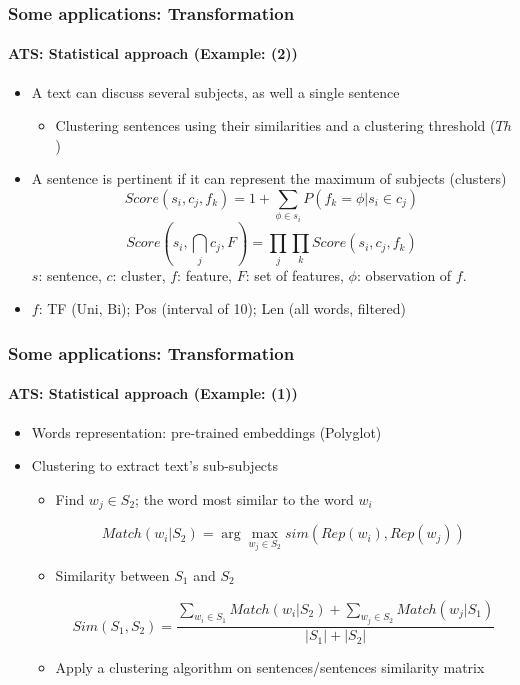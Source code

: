 \documentclass[xcolor=table]{beamer}
\begin{document}
\begin{frame}
	\frametitle{Some applications: Transformation}
	\framesubtitle{ATS: Statistical approach (Example: \cite{13-aries-al} (2))}
	
	\begin{itemize}
		\item A text can discuss several subjects, as well a single sentence
		\begin{itemize}
			\item Clustering sentences using their similarities and a clustering threshold ($Th$)
		\end{itemize}
		\item A sentence is pertinent if it can represent the maximum of subjects (clusters)
		\[ Score(s_i , c_j , f_k ) = 1 + \sum_{\phi \in s_i} {P(f_k=\phi | s_i \in c_j)} \]
		\[ Score(s_i , \bigcap_{j} c_j , F) =  %
		\prod_{j} \prod_{k} Score(s_i , c_j , f_k ) \]
		$ s $: sentence, $ c $: cluster, $ f $: feature, $ F $: set of features, $ \phi $: observation of $ f $.
		\item $f$: TF (Uni, Bi); Pos (interval of 10); Len (all words, filtered)
	\end{itemize}
	
\end{frame}

\begin{frame}
	\frametitle{Some applications: Transformation}
	\framesubtitle{ATS: Statistical approach (Example: \cite{15-oufaida-al} (1))}
	\begin{itemize}
		\item Words representation: pre-trained embeddings (Polyglot)
		\item Clustering to extract text's sub-subjects
		\begin{itemize}
			\item Find $w_j \in S_2$; the word most similar to the word $w_i$
			
			\[Match(w_i | S_2) = \arg\max_{w_j \in S_2} sim(Rep(w_i), Rep(w_j))\]
			
			\item Similarity between $S_1$ and $S_2$
			
			\[Sim(S_1, S_2) = \frac{\sum_{w_i \in S_1} Match(w_i | S_2) + \sum_{w_j \in S_2} Match(w_j | S_1)}{|S_1| + |S_2|}\]
			
			\item Apply a clustering algorithm on sentences/sentences similarity matrix
		\end{itemize}
	
	\end{itemize}
	
\end{frame}
\end{document}
